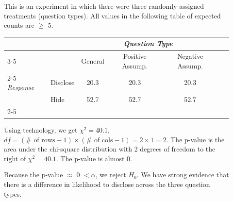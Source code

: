 \begin{examplewrap}
\begin{nexample}
\begin{description}
\item[] This is an experiment in which there were three randomly assigned treatments (question types).  All values in the following table of expected counts are $\ge$ 5.
\vspace{-3mm}
\begin{center}
\begin{tabular}{l l c c c l}
								&			& \multicolumn{3}{c}{\textit{Question Type}}	&\hspace{17mm}\ 		\\
\cline{3-5}
								&			& General		& Positive Assump. & Negative Assump.	\\
\cline{2-5}
\textit{Response}									& Disclose		& 20.3		& 20.3 & 20.3 	\\
				& Hide			& 52.7		& 52.7 &  52.7	\\
\cline{2-5}
\end{tabular}
\end{center}

\item[]  Using technology, we get $\chi^2 = 40.1$, $df = (\# \text{ of rows} - 1) \times (\# \text{ of cols} - 1) = 2\times 1 = 2$.
\newline The p-value is the area under the chi-square distribution with 2 degrees of freedom to the right of $\chi^2=40.1$. The p-value is almost 0.  
\item[]  Because the p-value $\approx$ 0 $ < \alpha$, we reject $H_0$. We have strong evidence that there is a difference in likelihood to disclose across the three question types. 
\end{description}
\end{nexample}
\end{examplewrap}




